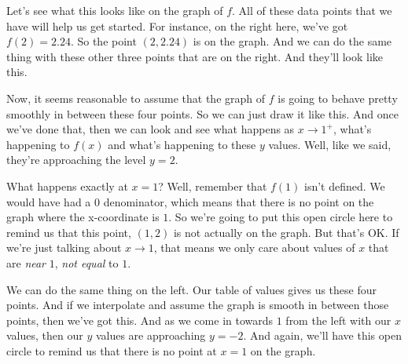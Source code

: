 \documentclass[pdftex, brazil, 12pt, twoside]{article}
\begin{document}
Let's see what this looks like on the graph of $f$.
All of these data points that we have will help us get started.
For instance, on the right here, we've got $f(2) = 2.24$.
So the point $(2, 2.24)$ is on the graph.
And we can do the same thing with these other three points
that are on the right.
And they'll look like this.

Now, it seems reasonable to assume that the graph of $f$
is going to behave pretty smoothly in between these four
points.
So we can just draw it like this.
And once we've done that, then we can look and see
what happens as $x \to 1^{+}$, what's
happening to $f(x)$ and what's happening to these $y$ values.
Well, like we said, they're approaching
the level $y = 2$.

What happens exactly at $x = 1$?
Well, remember that $f(1)$ isn't defined.
We would have had a $0$ denominator, which
means that there is no point on the graph where
the x-coordinate is $1$.
So we're going to put this open circle here
to remind us that this point, $(1,2)$
is not actually on the graph.
But that's OK.
If we're just talking about $x \to 1$,
that means we only care about values of $x$ that are \emph{near} $1$,
\emph{not equal} to $1$.

We can do the same thing on the left.
Our table of values gives us these four points.
And if we interpolate and assume the graph
is smooth in between those points, then we've got this.
And as we come in towards $1$ from the left with our $x$ values,
then our $y$ values are approaching $y = -2$.
And again, we'll have this open circle
to remind us that there is no point at $x = 1$
on the graph.

\begin{figure}[H]
  \begin{center}
    \label{fig:one-sided-limits-2}
  \end{center}
\end{figure}
\end{document}
